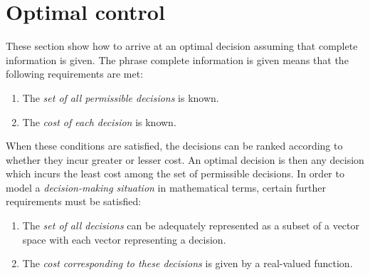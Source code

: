 \section{Optimal control}
\noindent These section show how to arrive at an optimal decision assuming that complete information is given. The phrase complete information is given means that the following requirements are met:
\begin{enumerate}
    \item The \textit{set of all permissible decisions} is known.
    \item The \textit{cost of each decision} is known.
\end{enumerate}
\noindent When these conditions are satisfied, the decisions can be ranked according to whether they incur greater or lesser cost. An optimal decision is then any decision which incurs the least cost among the set of permissible decisions. \newpage\noindent In order to model a \textit{decision-making situation} in mathematical terms, certain further requirements must be satisfied:
\begin{enumerate}
    \item The \textit{set of all decisions} can be adequately represented as a subset of a vector space with each vector representing a decision.
    \item The \textit{cost corresponding to these decisions} is given by a real-valued function.
\end{enumerate}
